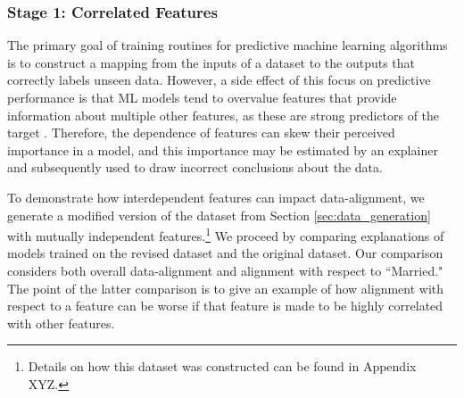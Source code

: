 \documentclass[mnsc,blindrev]{informs3}
\begin{document}
     \subsubsection{Stage 1: Correlated Features}
         \label{sec:role_of_correlation}
        
         The primary goal of training routines for predictive machine learning algorithms is to construct a mapping from the inputs of a dataset to the outputs that correctly labels unseen data. However, a side effect of this focus on predictive performance is that ML models tend to overvalue features that provide information about multiple other features, as these are strong predictors of the target \citep{scholkopf2021toward}. Therefore, the dependence of features can skew their perceived importance in a model, and this importance may be estimated by an explainer and subsequently used to draw incorrect conclusions about the data.



          


         To demonstrate how interdependent features can impact data-alignment, we generate a modified version of the dataset from Section \ref{sec:data_generation} with mutually independent features.\footnote{Details on how this dataset was constructed can be found in Appendix XYZ.} We proceed by comparing explanations of models trained on the revised dataset and the original dataset. Our comparison considers both overall data-alignment and alignment with respect to ``Married." The point of the latter comparison is to give an example of how alignment with respect to a feature can be worse if that feature is made to be highly correlated with other features.
        
\end{document}

